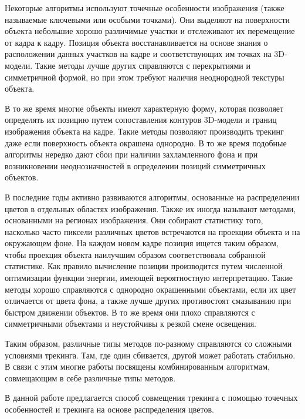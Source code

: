 Некоторые алгоритмы\cite{Vacchetti2004,Lourakis2013,Pauwels2013} используют
точечные особенности изображения (также называемые ключевыми или особыми
точками).
Они выделяют на поверхности объекта небольшие хорошо различимые
участки\cite{AKAZE,SIFT,ShiAndTomasi} и отслеживают их перемещение от кадра
к кадру\cite{TomasiAndKanade,SIFT,PyrLK}.
Позиция объекта восстанавливается на основе знания о расположении данных
участков на кадре и соответствующих им точках на 3D-модели\cite{EPnP}.
Такие методы лучше других справляются с перекрытиями и симметричной формой,
но при этом требуют наличия неоднородной текстуры объекта.

В то же время многие объекты имеют характерную форму, которая позволяет
определять их позицию путем сопоставления контуров 3D-модели
и границ\cite{EdgesSurvey,CANNY} изображения объекта на кадре.
Такие
методы\cite{RAPID,Marchand2003,Choi2012,Marchand2006,Klein2006,SeoHinterstoisser2014,WangZhong2015,Damen2012,VacchettiEdges2004}
позволяют производить трекинг даже если поверхность объекта окрашена однородно.
В то же время подобные алгоритмы нередко дают сбои при наличии захламленного
фона и при возникновении неоднозначностей в определении позиций
симметричных объектов.

В последние годы активно развиваются алгоритмы, основанные на
распределении цветов в отдельных областях
изображения\cite{PWP3D,Tjaden2017,Tjaden2018}.
Также их иногда называют методами, основанными на регионах изображения.
Они собирают статистику того, насколько часто пиксели различных цветов
встречаются на проекции объекта и на окружающем фоне.
На каждом новом кадре позиция ищется таким образом, чтобы проекция объекта
наилучшим образом соответствовала собранной статистике.
Как правило вычисление позиции производится путем численной оптимизации
функции энергии, имеющей вероятностную интерпретацию.
Такие методы хорошо справляются с однородно окрашенными объектами, если их цвет
отличается от цвета фона, а также лучше других противостоят смазыванию при
быстром движении объектов.
В то же время они плохо справляются с симметричными объектами и неустойчивы к
резкой смене освещения.

Таким образом, различные типы методов по-разному справляются со сложными
условиями трекинга.
Там, где один сбивается, другой может работать стабильно.  В связи с этим
многие работы\cite{RegionPhotometric,ColorFeature2018,Bugaev_2018_ECCV}
посвящены комбинированным алгоритмам, совмещающим в себе различные типы
методов.

В данной работе предлагается способ совмещения трекинга с помощью
точечных особенностей и трекинга на основе распределения цветов.


